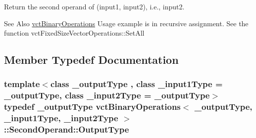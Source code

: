 Return the second operand of (input1, input2), i.\-e., input2. 

\begin{DoxySeeAlso}{See Also}
\hyperlink{classvct_binary_operations}{vct\-Binary\-Operations} Usage example is in recursive assignment. See the function vct\-Fixed\-Size\-Vector\-Operations\-::\-Set\-All 
\end{DoxySeeAlso}


\subsection{Member Typedef Documentation}
\hypertarget{classvct_binary_operations_1_1_second_operand_acc7e6d4248e776359bcefe27a2ea9f53}{
\subsubsection[{Output\-Type}]{\setlength{\rightskip}{0pt plus 5cm}template$<$class \-\_\-output\-Type , class \-\_\-input1\-Type  = \-\_\-output\-Type, class \-\_\-input2\-Type  = \-\_\-output\-Type$>$ typedef \-\_\-output\-Type {\bf vct\-Binary\-Operations}$<$ \-\_\-output\-Type, \-\_\-input1\-Type, \-\_\-input2\-Type $>$\-::{\bf Second\-Operand\-::\-Output\-Type}}}\label{classvct_binary_operations_1_1_second_operand_acc7e6d4248e776359bcefe27a2ea9f53}



